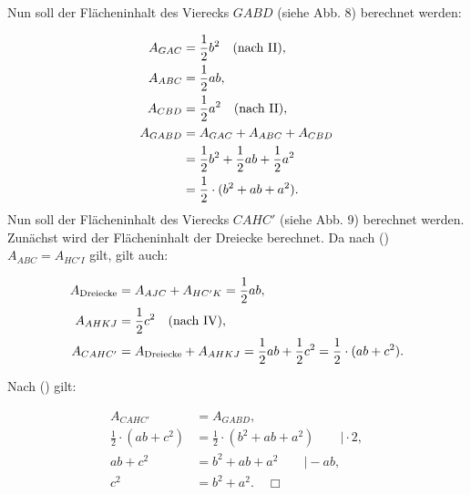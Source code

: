 \documentclass[a4paper,12pt]{article}
\begin{document}
Nun soll der Flächeninhalt des Vierecks $GABD$ (siehe Abb. 8) berechnet werden:

\begin{align*}
A_{GAC} &= \frac{1}{2} b^2 \quad\text{(nach \rom{2})},\\
A_{ABC} &= \frac{1}{2} a b,\\
A_{CBD} &= \frac{1}{2} a^2 \quad\text{(nach \rom{2})},\\
A_{GABD} &= A_{GAC} + A_{ABC} + A_{CBD} \\
&= \frac{1}{2} b^2 + \frac{1}{2}ab + \frac{1}{2} a^2\\
&= \frac{1}{2} \cdot (b^2 + ab + a^2).
\end{align*}
Nun soll der Flächeninhalt des Vierecks $CAHC'$ (siehe Abb. 9) berechnet werden. Zunächst wird der Flächeninhalt der Dreiecke berechnet. Da nach () $A_{ABC} = A_{HC'I}$ gilt, gilt auch:

\begin{align*}
A_{\textrm{Dreiecke}} &= A_{AJC} + A_{HC'K} = \frac{1}{2}ab,\\
A_{AHKJ} &= \frac{1}{2}c^2 \quad\text{(nach \rom{4})},\\
A_{CAHC'} &= A_{\textrm{Dreiecke}} + A_{AHKJ} = \frac{1}{2}ab + \frac{1}{2}c^2 = \frac{1}{2} \cdot (ab + c^2).
\end{align*}

Nach () gilt:

\begin{align*}
A_{CAHC'} &= A_{GABD},\\
\frac{1}{2} \cdot (ab + c^2) &= \frac{1}{2} \cdot (b^2 + ab + a^2) \qquad\vert \cdot 2,\\
ab + c^2 &= b^2 + ab + a^2 \qquad\vert -ab,\\
c^2 &= b^2 + a^2. \quad\Box
\end{align*}
\end{document}
